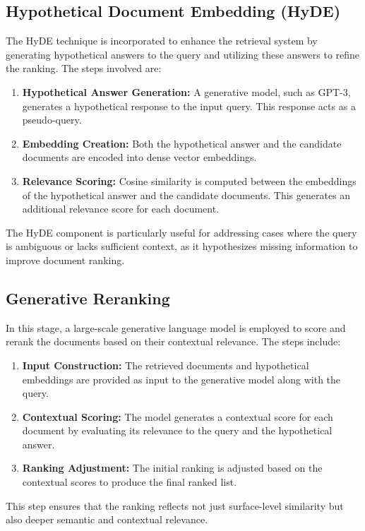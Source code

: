 \subsection{Hypothetical Document Embedding (HyDE)}
The HyDE technique is incorporated to enhance the retrieval system by generating hypothetical answers to the query and utilizing these answers to refine the ranking. The steps involved are:
\begin{enumerate}
    \item \textbf{Hypothetical Answer Generation:} A generative model, such as GPT-3, generates a hypothetical response to the input query. This response acts as a pseudo-query.
    \item \textbf{Embedding Creation:} Both the hypothetical answer and the candidate documents are encoded into dense vector embeddings.
    \item \textbf{Relevance Scoring:} Cosine similarity is computed between the embeddings of the hypothetical answer and the candidate documents. This generates an additional relevance score for each document.
\end{enumerate}

The HyDE component is particularly useful for addressing cases where the query is ambiguous or lacks sufficient context, as it hypothesizes missing information to improve document ranking.

\subsection{Generative Reranking}
In this stage, a large-scale generative language model is employed to score and rerank the documents based on their contextual relevance. The steps include:
\begin{enumerate}
    \item \textbf{Input Construction:} The retrieved documents and hypothetical embeddings are provided as input to the generative model along with the query.
    \item \textbf{Contextual Scoring:} The model generates a contextual score for each document by evaluating its relevance to the query and the hypothetical answer.
    \item \textbf{Ranking Adjustment:} The initial ranking is adjusted based on the contextual scores to produce the final ranked list.
\end{enumerate}

This step ensures that the ranking reflects not just surface-level similarity but also deeper semantic and contextual relevance.


